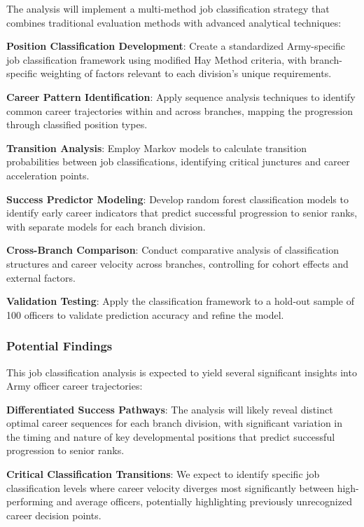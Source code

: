 \documentclass[
  letterpaper,
  DIV=11,
  numbers=noendperiod]{scrartcl}
\begin{document}
The analysis will implement a multi-method job classification strategy
that combines traditional evaluation methods with advanced analytical
techniques:

\textbf{Position Classification Development}: Create a standardized
Army-specific job classification framework using modified Hay Method
criteria, with branch-specific weighting of factors relevant to each
division's unique requirements.

\textbf{Career Pattern Identification}: Apply sequence analysis
techniques to identify common career trajectories within and across
branches, mapping the progression through classified position types.

\textbf{Transition Analysis}: Employ Markov models to calculate
transition probabilities between job classifications, identifying
critical junctures and career acceleration points.

\textbf{Success Predictor Modeling}: Develop random forest
classification models to identify early career indicators that predict
successful progression to senior ranks, with separate models for each
branch division.

\textbf{Cross-Branch Comparison}: Conduct comparative analysis of
classification structures and career velocity across branches,
controlling for cohort effects and external factors.

\textbf{Validation Testing}: Apply the classification framework to a
hold-out sample of 100 officers to validate prediction accuracy and
refine the model.

\subsubsection{Potential Findings}\label{potential-findings}

This job classification analysis is expected to yield several
significant insights into Army officer career trajectories:

\textbf{Differentiated Success Pathways}: The analysis will likely
reveal distinct optimal career sequences for each branch division, with
significant variation in the timing and nature of key developmental
positions that predict successful progression to senior ranks.

\textbf{Critical Classification Transitions}: We expect to identify
specific job classification levels where career velocity diverges most
significantly between high-performing and average officers, potentially
highlighting previously unrecognized career decision points.
\end{document}
